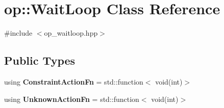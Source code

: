 \hypertarget{classop_1_1WaitLoop}{\section{op\-:\-:Wait\-Loop Class Reference}
\label{classop_1_1WaitLoop}
}


{\ttfamily \#include $<$op\-\_\-waitloop.\-hpp$>$}

\subsection*{Public Types}
\begin{DoxyCompactItemize}
\item 
\hypertarget{classop_1_1WaitLoop_af0132a11722653e4f7b2d6bd3f214497}{using {\bfseries Constraint\-Action\-Fn} = std\-::function$<$ void(int)$>$}\label{classop_1_1WaitLoop_af0132a11722653e4f7b2d6bd3f214497}

\item 
\hypertarget{classop_1_1WaitLoop_ac64e8a4081d0d17040dfd714b76b289f}{using {\bfseries Unknown\-Action\-Fn} = std\-::function$<$ void(int)$>$}\label{classop_1_1WaitLoop_ac64e8a4081d0d17040dfd714b76b289f}

\end{DoxyCompactItemize}
